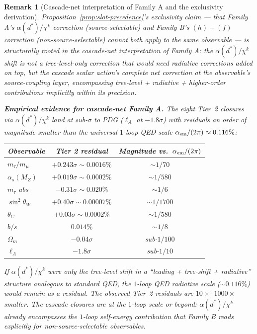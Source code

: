 \documentclass[12pt,a4paper]{article}
\newtheorem*{remark}{Remark}
\begin{document}
\begin{remark}[Cascade-net interpretation of Family A and the exclusivity derivation]\label{rem:family-a-net}
Proposition~\ref{prop:slot-precedence}'s exclusivity claim --- that
Family A's $\alpha(d^*)/\chi^k$ correction (source-selectable) and
Family B's $(h)+(f)$ correction (non-source-selectable) cannot
both apply to the same observable --- is structurally rooted in
the \emph{cascade-net} interpretation of Family A: the
$\alpha(d^*)/\chi^k$ shift is not a tree-level-only correction
that would need radiative corrections added on top, but the
cascade scalar action's complete net correction at the observable's
source-coupling layer, encompassing tree-level + radiative +
higher-order contributions implicitly within its precision.

\medskip\noindent\textbf{Empirical evidence for cascade-net Family A.}
The eight Tier~2 closures via $\alpha(d^*)/\chi^k$ land at
sub-$\sigma$ to PDG ($\ell_A$ at $-1.8\sigma$) with residuals an order of magnitude smaller
than the universal $1$-loop QED scale $\alpha_{\rm em}/(2\pi)
\approx 0.116\%$:
\begin{center}
\renewcommand{\arraystretch}{1.15}
\begin{tabular}{lcc}
\toprule
Observable & Tier 2 residual & Magnitude vs.\ $\alpha_{\rm em}/(2\pi)$ \\
\midrule
$m_\tau/m_\mu$    & $+0.243\sigma \sim 0.0016\%$ & $\sim 1/70$ \\
$\alpha_s(M_Z)$   & $+0.019\sigma \sim 0.0002\%$ & $\sim 1/580$ \\
$m_\tau$ abs       & $-0.31\sigma \sim 0.020\%$    & $\sim 1/6$ \\
$\sin^2\theta_W$  & $+0.40\sigma \sim 0.00007\%$ & $\sim 1/1700$ \\
$\theta_C$         & $+0.03\sigma \sim 0.0002\%$ & $\sim 1/580$ \\
$b/s$              & $0.014\%$                    & $\sim 1/8$ \\
$\Omega_m$         & $-0.04\sigma$               & sub-$1/100$ \\
$\ell_A$           & $-1.8\sigma$                & sub-$1/10$ \\
\bottomrule
\end{tabular}
\end{center}
If $\alpha(d^*)/\chi^k$ were only the tree-level shift in a
``leading + tree-shift + radiative'' structure analogous to
standard QED, the $1$-loop QED radiative scale ($\sim 0.116\%$)
would remain as a residual. The observed Tier~2 residuals are
$10\times$--$1000\times$ smaller. The cascade closures are at the
$1$-loop scale or beyond: $\alpha(d^*)/\chi^k$ already encompasses
the $1$-loop self-energy contribution that Family B reads explicitly
for non-source-selectable observables.


\end{remark}
\end{document}
